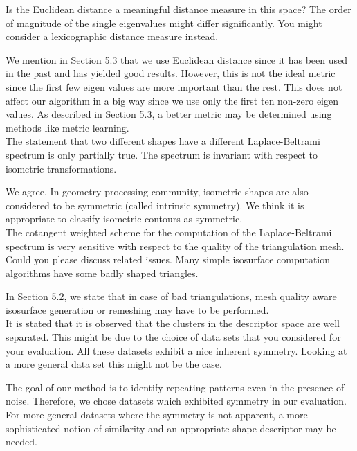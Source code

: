 \documentclass[10pt]{article}
\begin{document}
   Is the Euclidean distance a meaningful distance measure in this space?
   The order of magnitude of the single eigenvalues might differ
   significantly. You might consider a lexicographic distance measure
   instead.

   {\color{blue}We mention in Section 5.3 that we use Euclidean distance
	   since it has been used in the past and has yielded good results.
	   However, this is not the ideal metric since the first few eigen
	   values are more important than the rest. This does not affect our
	   algorithm in a big way since we use only the first ten non-zero
	   eigen values. As described in Section 5.3, a better metric may
   be determined using methods like metric learning.}\\

   The statement that two different shapes have a different
   Laplace-Beltrami spectrum is only partially true. The spectrum is
   invariant with respect to isometric transformations.  

   {\color{blue} We agree. In geometry processing community,
	   isometric shapes are also considered to be symmetric (called intrinsic symmetry).
   We think it is appropriate to classify isometric contours as symmetric.}\\

   The cotangent weighted scheme for the computation of the
   Laplace-Beltrami spectrum is very sensitive with respect to the quality
   of the triangulation mesh. Could you please discuss related issues. Many
   simple isosurface computation algorithms have some badly shaped
   triangles.

   {\color{blue}In Section 5.2, we state that in case of bad triangulations,
	   mesh quality aware isosurface generation or remeshing may have to
   be performed.}\\


   It is stated that it is observed that the clusters in the descriptor
   space are well separated. This might be due to the choice of data sets
   that you considered for your evaluation. All these datasets exhibit a
   nice inherent symmetry. Looking at a more general data set this might not
   be the case.

   {\color{blue} The goal of our method is to identify repeating patterns even in
	   the presence of noise. Therefore, we chose datasets which exhibited symmetry in our
	   evaluation. For more general datasets where the symmetry is not apparent, a more sophisticated
	   notion of similarity and an appropriate  shape descriptor may be needed.}\\
\end{document}
